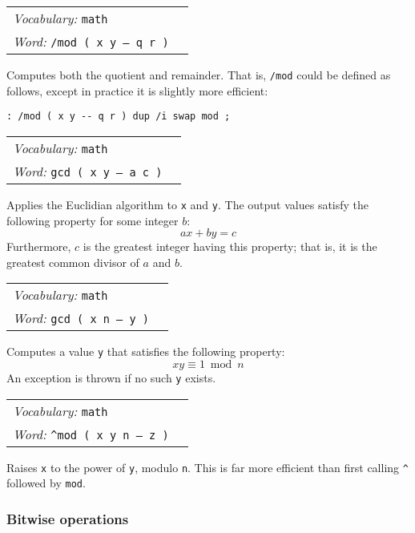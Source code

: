 \documentclass{book}
\newcommand{\vocabulary}[1]{\emph{Vocabulary:} \texttt{#1}&\\}
\newcommand{\ordinaryword}[2]{\index{\texttt{#1}}\emph{Word:} \texttt{#2}&\\}
\newcommand{\wordtable}[1]{


\begin{tabularx}{12cm}{lX}
\hline
#1
\hline
\end{tabularx}

}
\begin{document}
\wordtable{
\vocabulary{math}
\ordinaryword{/mod}{/mod ( x y -- q r )}
}
Computes both the quotient and remainder. That is, \texttt{/mod} could be defined as follows, except in practice it is slightly more efficient:
\begin{verbatim}
: /mod ( x y -- q r ) dup /i swap mod ;
\end{verbatim}
\wordtable{
\vocabulary{math}
\ordinaryword{gcd}{gcd ( x y -- a c )}
}
Applies the Euclidian algorithm to \texttt{x} and \texttt{y}. The output values satisfy the following property for some integer $b$:
$$ax+by=c$$
Furthermore, $c$ is the greatest integer having this property; that is, it is the greatest common divisor of $a$ and $b$.
\wordtable{
\vocabulary{math}
\ordinaryword{mod-inv}{gcd ( x n -- y )}
}
Computes a value \texttt{y} that satisfies the following property:
$$xy \equiv 1 \bmod{n}$$ An exception is thrown if no such \texttt{y} exists.
\wordtable{
\vocabulary{math}
\ordinaryword{\^{}mod}{\^{}mod ( x y n -- z )}
}
Raises \texttt{x} to the power of \texttt{y}, modulo \texttt{n}. This is far more efficient than first calling \texttt{\^{}} followed by \texttt{mod}.

\subsubsection{\label{bitwise}Bitwise operations}
\end{document}
